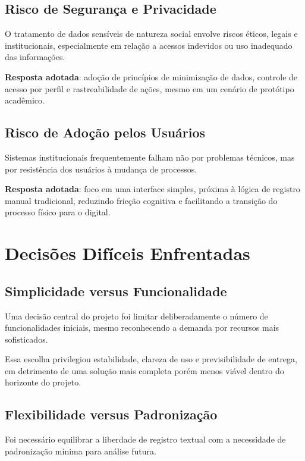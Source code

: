 \subsection{Risco de Segurança e Privacidade}

O tratamento de dados sensíveis de natureza social envolve riscos éticos, legais e institucionais, especialmente em relação a acessos indevidos ou uso inadequado das informações.

\textbf{Resposta adotada}: adoção de princípios de minimização de dados, controle de acesso por perfil e rastreabilidade de ações, mesmo em um cenário de protótipo acadêmico.

\subsection{Risco de Adoção pelos Usuários}

Sistemas institucionais frequentemente falham não por problemas técnicos, mas por resistência dos usuários à mudança de processos.

\textbf{Resposta adotada}: foco em uma interface simples, próxima à lógica de registro manual tradicional, reduzindo fricção cognitiva e facilitando a transição do processo físico para o digital.

\section{Decisões Difíceis Enfrentadas}

\subsection{Simplicidade versus Funcionalidade}

Uma decisão central do projeto foi limitar deliberadamente o número de funcionalidades iniciais, mesmo reconhecendo a demanda por recursos mais sofisticados.

Essa escolha privilegiou estabilidade, clareza de uso e previsibilidade de entrega, em detrimento de uma solução mais completa porém menos viável dentro do horizonte do projeto.

\subsection{Flexibilidade versus Padronização}

Foi necessário equilibrar a liberdade de registro textual com a necessidade de padronização mínima para análise futura.

